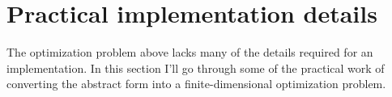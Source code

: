 \documentclass[11pt]{article}
\providecommand{\argmax}[1]{\underset{#1}{\mathrm{argmax}}\,}
\providecommand{\mc}[1]{\mathcal{#1}}
\providecommand{\mf}[1]{\mathfrak{#1}}
\providecommand{\mbb}[1]{\mathbb{#1}}
\begin{document}


\section{Practical implementation details}
The optimization problem above lacks many of the details required for an
implementation. In this section I'll go through some of the practical work of
converting the abstract form into a finite-dimensional optimization problem.
\end{document}
